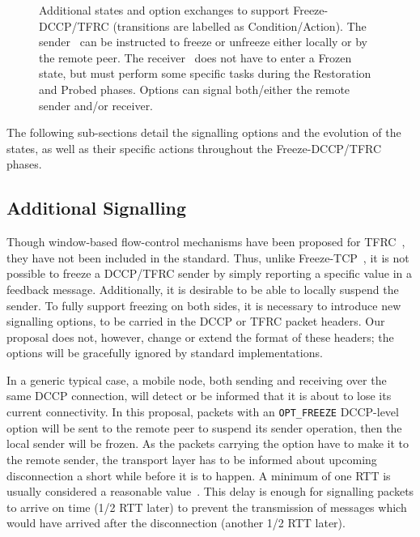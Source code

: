 \documentclass[twocolumn]{nictatechreport}
\begin{document}
\begin{figure*}[tb]
  \caption[Additional states and option exchanges to support
  Freeze-DCCP/TFRC]{Additional states and option exchanges to support
  Freeze-DCCP/TFRC (transitions are labelled as Condition/Action).  The
  sender~ can be instructed to freeze or
  unfreeze either locally or by the remote peer. The
  receiver~ does not have to enter a Frozen
  state, but must perform some specific tasks during the Restoration and Probed
  phases.  Options can signal both/either the remote sender and/or receiver.}

  \label{fig:freeze-states}
\end{figure*}

The following sub-sections detail the signalling options and the evolution of the
states, as well as their specific actions throughout the Freeze-DCCP/TFRC phases.

\subsection{Additional Signalling}

Though window-based flow-control mechanisms have been proposed for
TFRC~\cite{2010lochin_chameleon}, they have not been included in the standard.
Thus, unlike Freeze-TCP~\cite{2000goff_freezetcp}, it is not possible to freeze
a DCCP/TFRC sender by simply reporting a specific value in a feedback message.
Additionally, it is desirable to be able to locally suspend the sender. To fully
support freezing on both sides, it is necessary to introduce new signalling
options, to be carried in the DCCP or TFRC packet headers. Our proposal does
not, however, change or extend the format of these headers; the options will be
gracefully ignored by standard implementations.

In a generic typical case, a mobile node, both sending and receiving over the
same DCCP connection, will detect or be informed that it is about to lose its
current connectivity. In this proposal, packets with an \verb#OPT_FREEZE#
DCCP-level option will be sent to the remote peer to suspend its sender
operation, then the local sender will be frozen. As the packets carrying the
option have to make it to the remote sender, the transport layer has to be
informed about upcoming disconnection a short while before it is to happen. A
minimum of one RTT is usually considered a reasonable
value~\cite{2000goff_freezetcp}. This delay is enough for signalling packets to
arrive on time (1/2 RTT later) to prevent the transmission of messages which
would have arrived after the disconnection (another 1/2 RTT later).
\end{document}
